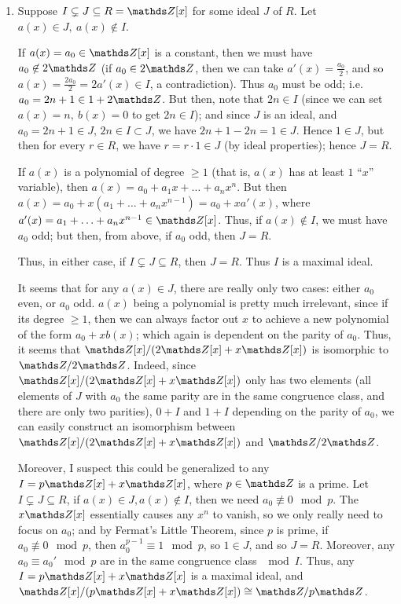 \documentclass{homework}
\begin{document}
\begin{solution}
\begin{enumerate}[label=(\alph*)]
    \item Suppose $I\subsetneq J \subseteq R=\Z[x]$ for some ideal $J$ of $R$. Let $a(x)\in J,\
      a(x)\not\in I$.

      If $a(x)=a_0\in \Z[x]$ is a constant, then we must have $a_0\not\in 2\Z$ (if $a_0\in 2\Z$,
      then we can take $a'(x)=\frac{a_0}{2}$, and so $a(x)=\frac{2a_0}{2}=2a'(x)\in I$, a
      contradiction).  Thus $a_0$ must be odd; i.e. $a_0=2n+1\in 1+2\Z$. But then, note that $2n\in
      I$ (since we can set $a(x)=n,\ b(x)=0$ to get $2n\in I$); and since $J$ is an ideal, and
      $a_0=2n+1\in J$, $2n\in I\subset J$, we have $2n+1-2n=1\in J$. Hence $1\in J$, but then for
      every $r\in R$, we have $r=r\cdot 1\in J$ (by ideal properties); hence $J=R$.

      If $a(x)$ is a polynomial of degree $\ge 1$ (that is, $a(x)$ has at least $1$ ``$x$''
      variable), then $a(x)=a_0+a_1x+\ldots+a_nx^{n}$. But then
      $a(x)=a_0+x(a_1+\ldots+a_nx^{n-1})=a_0+xa'(x)$, where $a'(x)=a_1+\ldots+a_nx^{n-1}\in \Z[x]$.
      Thus, if $a(x)\not\in I$, we must have $a_0$ odd; but then, from above, if $a_0$ odd, then
      $J=R$.

      Thus, in either case, if $I\subsetneq J\subseteq R$, then $J=R$. Thus $I$ is a maximal ideal.

      \begin{remark}
        It seems that for any $a(x)\in J$, there are really only two cases: either $a_0$ even, or
        $a_0$ odd. $a(x)$ being a polynomial is pretty much irrelevant, since if its degree $\ge 1$,
        then we can always factor out $x$ to achieve a new polynomial of the form $a_0+xb(x)$; which
        again is dependent on the parity of $a_0$. Thus, it seems that $\Z[x] / (2\Z[x]+x\Z[x])$ is
        isomorphic to $\Z / 2\Z$. Indeed, since $\Z[x] / (2\Z[x]+x\Z[x])$ only has two elements (all
        elements of $J$ with $a_0$ the same parity are in the same congruence class, and there are
        only two parities), $0+I$ and $1+I$ depending on the parity of $a_0$, we can easily
        construct an isomorphism between $\Z[x] / (2\Z[x]+x\Z[x])$ and $\Z / 2\Z$.

        Moreover, I suspect this could be generalized to any $I = p\Z[x] + x\Z[x]$, where $p\in \Z$
        is a prime. Let $I\subsetneq J\subseteq R$, if $a(x)\in J,a(x)\not\in I$, then we need
        $a_0\not\equiv 0\mod{p}$. The $x\Z[x]$ essentially causes any $x^n$ to vanish, so we only
        really need to focus on $a_0$; and by Fermat's Little Theorem, since $p$ is prime, if
        $a_0\not\equiv 0\mod{p}$, then $a_0^{p-1}\equiv 1\mod{p}$, so $1\in J$, and so $J=R$.
        Moreover, any $a_0\equiv a_0'\mod{p}$ are in the same congruence class $\mod{I}$. Thus, any
        $I=p\Z[x]+x\Z[x]$ is a maximal ideal, and $\Z[x] / (p\Z[x] + x\Z[x])\cong \Z / p\Z$.
      \end{remark}
      
  \end{enumerate}
\end{solution}
\end{document}
